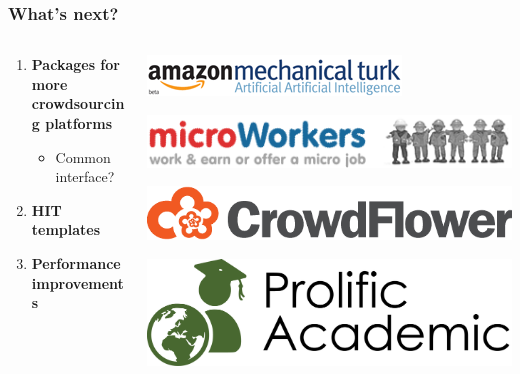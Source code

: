 \documentclass[14pt]{beamer}
\begin{document}
\begin{frame}
    \frametitle{What's next?}
    \begin{columns}
        \begin{column}{.5\linewidth}
          \begin{enumerate}\itemsep2em
          \item \textbf{Packages for more crowdsourcing platforms}\\
              \begin{itemize}
              \item Common interface?
              \end{itemize}
          \item \textbf{HIT templates}
          \item \textbf{Performance improvements}
          \end{enumerate}
        \end{column}
        \begin{column}{.5\linewidth}
            \includegraphics[width=\textwidth]{mturk}
            \vspace{2em}
            
            \includegraphics[width=\textwidth]{microworkers}
            \vspace{2em}
                        
            \includegraphics[width=\textwidth]{crowdflower}
            \vspace{2em}
                        
            \includegraphics[width=\textwidth]{prolificacademic}
        \end{column}
    \end{columns}
\end{frame}
\end{document}
